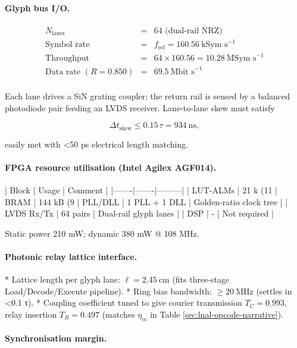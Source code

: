 \documentclass[11pt,oneside]{book}
\begin{document}
\paragraph{Glyph bus I/O.}

\[
\begin{array}{lcl}
N_{\text{lanes}} &=& 64 \text{ (dual-rail NRZ)}\\
\text{Symbol rate} &=& f_{\text{ref}} =160.56\ \text{kSym s}^{-1}\\
\text{Throughput} &=& 64\times160.56=10.28\ \text{MSym s}^{-1}\\
\text{Data rate }(R=0.850)&=&69.5\ \text{Mbit s}^{-1}\\
\end{array}
\]

Each lane drives a SiN grating coupler; the return rail is sensed by a
balanced photodiode pair feeding an LVDS receiver.  Lane-to-lane skew
must satisfy  

\[
\Delta t_{\text{skew}}\le0.15\,\tau = 934\ \text{ns},
\]

easily met with <50 ps electrical length matching.

\paragraph{FPGA resource utilisation (Intel Agilex AGF014).}

| Block | Usage | Comment |
|-------|-------|---------|
| LUT-ALMs | 21 k (11 %
| BRAM | 144 kB (9 %
| PLL/DLL | 1 PLL + 1 DLL | Golden-ratio clock tree |
| LVDS Rx/Tx | 64 pairs | Dual-rail glyph lanes |
| DSP | - | Not required |

Static power 210 mW; dynamic 380 mW @ 108 MHz.

\paragraph{Photonic relay lattice interface.}

* Lattice length per glyph lane: \(\ell=2.45\ \text{cm}\)  
  (fits three-stage Load/Decode/Execute pipeline).
* Ring bias bandwidth: \(\ge20\ \text{MHz}\)  
  (settles in <0.1 τ).
* Coupling coefficient tuned to give courier transmission
  \(T_{C}=0.993\), relay insertion \(T_{R}=0.497\)  
  (matches \(\eta_{m}\) in Table \ref{sec:lnal-opcode-narrative}).

\paragraph{Synchronisation margin.}
\end{document}
